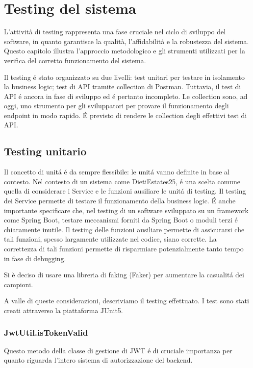 \chapter{Testing del sistema}
L'attività di testing rappresenta una fase cruciale nel ciclo 
di sviluppo del software, in quanto garantisce la qualità, 
l'affidabilità e la robustezza del sistema. Questo capitolo 
illustra l'approccio metodologico e gli strumenti utilizzati per 
la verifica del corretto funzionamento del sistema.

Il testing é stato organizzato su due livelli: test unitari per
testare in isolamento la business logic; test di API tramite collection
di Postman. Tuttavia, il test di API é ancora in fase di sviluppo ed
é pertanto incompleto. Le collection sono, ad oggi, uno strumento per
gli sviluppatori per provare il funzionamento degli endpoint in modo rapido.
É previsto di rendere le collection degli effettivi test di API.

\section{Testing unitario}
Il concetto di unitá é da sempre flessibile: le unitá vanno definite
in base al contesto. Nel contesto di un sistema come DietiEstates25, é
una scelta comune quella di considerare i Service e le funzioni ausiliare
le unitá di testing.
Il testing dei Service permette di testare il funzionamento della business
logic. É anche importante specificare che, nel testing di un software sviluppato
su un framework come Spring Boot, testare meccanismi forniti da Spring Boot o
moduli terzi é chiaramente inutile.
Il testing delle funzioni ausiliare permette di assicurarsi che tali funzioni,
spesso largamente utilizzate nel codice, siano corrette. La correttezza di tali funzioni
permette di risparmiare potenzialmente tanto tempo in fase di debugging.

Si è deciso di usare una libreria di faking (Faker) per aumentare la casualitá dei campioni.

A valle di queste considerazioni, descriviamo il testing effettuato.
I test sono stati creati attraverso la piattaforma JUnit5.
\subsection{JwtUtil.isTokenValid}
Questo metodo della classe di gestione di JWT é di cruciale importanza per quanto
riguarda l'intero sistema di autorizzazione del backend.

